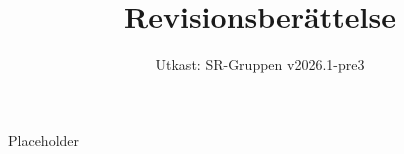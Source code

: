 \documentclass[a4paper]{dtek}
\title{Revisionsberättelse}
\date{Utkast: SR-Gruppen v2026.1-pre3}
\begin{document}
Placeholder
\end{document}
